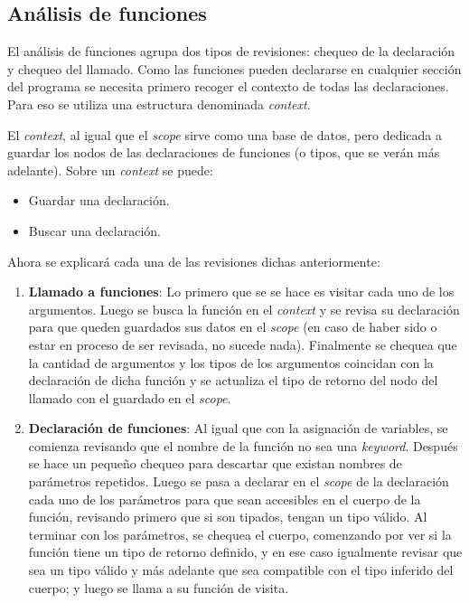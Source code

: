 \documentclass{llncs}
\begin{document}
\subsection{Análisis de funciones}

El análisis de funciones agrupa dos tipos de revisiones: chequeo de la declaración y chequeo del llamado. Como las funciones pueden declararse en cualquier sección del programa 
se necesita primero recoger el contexto de todas las declaraciones. Para eso se utiliza una estructura denominada \textit{context}.

El \textit{context}, al igual que el \textit{scope} sirve como una base de datos, pero dedicada a guardar los nodos de las declaraciones de funciones (o tipos, que se verán más adelante). 
Sobre un \textit{context} se puede: 
\begin{itemize}
    \item Guardar una declaración.
    \item Buscar una declaración.
\end{itemize}

Ahora se explicará cada una de las revisiones dichas anteriormente:
\begin{enumerate}
    \item \textbf{Llamado a funciones}: Lo primero que se se hace es visitar cada uno de los argumentos. Luego se busca la función en el \textit{context} y se revisa su declaración para que queden guardados sus 
    datos en el \textit{scope} (en caso de haber sido o estar en proceso de ser revisada, no sucede nada). Finalmente se chequea que la cantidad de argumentos y los tipos de los argumentos coincidan con la declaración 
    de dicha función y se actualiza el tipo de retorno del nodo del llamado con el guardado en el \textit{scope}.
    \item \textbf{Declaración de funciones}: Al igual que con la asignación de variables, se comienza revisando que el nombre de la función no sea una \textit{keyword}. Después se hace un pequeño chequeo para descartar que existan 
    nombres de parámetros repetidos. Luego se pasa a declarar en el \textit{scope} de la declaración cada uno de los parámetros para que sean accesibles en el cuerpo de la función, revisando primero que si son tipados, tengan un tipo válido. Al terminar 
    con los parámetros, se chequea el cuerpo, comenzando por ver si la función tiene un tipo de retorno definido, y en ese caso igualmente revisar que sea un tipo válido y más adelante que sea compatible con el tipo inferido del cuerpo; y luego se llama a su
    función de visita.
\end{enumerate}
\end{document}
